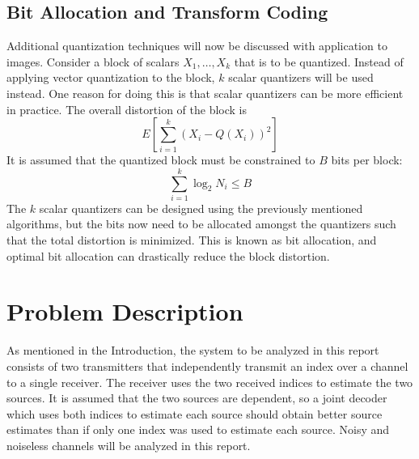 \documentclass[10pt,twoside,titlepage]{article}
\begin{document}
\subsection{Bit Allocation and Transform Coding}
\label{sec:bit_alloc}
Additional quantization techniques will now be discussed with application to images. Consider a block of scalars $X_1,\ldots,X_k$ that is to be quantized. Instead of applying vector quantization to the block, $k$ scalar quantizers will be used instead. One reason for doing this is that scalar quantizers can be more efficient in practice. The overall distortion of the block is
\begin{equation*}
E\left[\sum_{i=1}^k(X_i - Q(X_i))^2\right]
\end{equation*}
It is assumed that the quantized block must be constrained to $B$ bits per block:
\begin{equation*}
\sum_{i=1}^k \log_2 N_i \le B
\end{equation*}
The $k$ scalar quantizers can be designed using the previously mentioned algorithms, but the bits now need to be allocated amongst the quantizers such that the total distortion is minimized. This is known as bit allocation, and optimal bit allocation can drastically reduce the block distortion.

\section{Problem Description}
\label{sec:prob_desc}
As mentioned in the Introduction, the system to be analyzed in this report consists of two transmitters that independently transmit an index over a channel to a single receiver. The receiver uses the two received indices to estimate the two sources. It is assumed that the two sources are dependent, so a joint decoder which uses both indices to estimate each source should obtain better source estimates than if only one index was used to estimate each source. Noisy and noiseless channels will be analyzed in this report.
\end{document}
